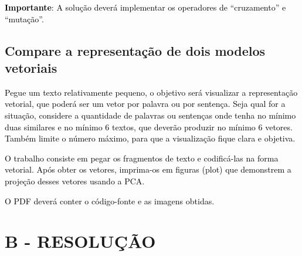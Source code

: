 \textbf{\textcolor{black}{Importante}}\textcolor{black}{: A solução deverá implementar os operadores de “cruzamento” e
“mutação”.}


\subsection{Compare a representação de dois modelos vetoriais}


\textcolor{black}{Pegue um texto relativamente pequeno, o objetivo será visualizar a representação vetorial, que poderá
ser um vetor por palavra ou por sentença. Seja qual for a situação, considere a quantidade de palavras ou sentenças
onde tenha no mínimo duas similares e no mínimo 6 textos, que deverão produzir no mínimo 6 vetores. Também limite o
número máximo, para que a visualização fique clara e objetiva.}


\textcolor{black}{O trabalho consiste em pegar os fragmentos de texto e codificá-las na forma vetorial. Após obter os
vetores, imprima-os em figuras (plot) que demonstrem a projeção desses vetores usando a PCA.}


\textcolor{black}{O PDF deverá conter o código-fonte e as imagens obtidas.}


\section*{\textbf{B - RESOLUÇÃO}}
\lipsum[30]